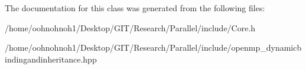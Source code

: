 The documentation for this class was generated from the following files\+:\begin{DoxyCompactItemize}
\item 
/home/oohnohnoh1/\+Desktop/\+G\+I\+T/\+Research/\+Parallel/include/Core.\+h\item 
/home/oohnohnoh1/\+Desktop/\+G\+I\+T/\+Research/\+Parallel/include/openmp\+\_\+dynamicbindingandinheritance.\+hpp\end{DoxyCompactItemize}
